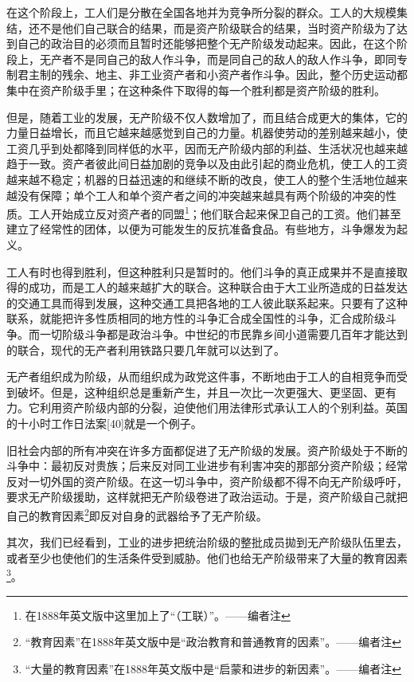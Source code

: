 \documentclass[UTF8,zihao=-4,a4paper]{ctexart}
\begin{document}
在这个阶段上，工人们是分散在全国各地并为竞争所分裂的群众。工人的大规模集结，还不是他们自己联合的结果，而是资产阶级联合的结果，当时资产阶级为了达到自己的政治目的必须而且暂时还能够把整个无产阶级发动起来。因此，在这个阶段上，无产者不是同自己的敌人作斗争，而是同自己的敌人的敌人作斗争，即同专制君主制的残余、地主、非工业资产者和小资产者作斗争。因此，整个历史运动都集中在资产阶级手里；在这种条件下取得的每一个胜利都是资产阶级的胜利。\par
但是，随着工业的发展，无产阶级不仅人数增加了，而且结合成更大的集体，它的力量日益增长，而且它越来越感觉到自己的力量。机器使劳动的差别越来越小，使工资几乎到处都降到同样低的水平，因而无产阶级内部的利益、生活状况也越来越趋于一致。资产者彼此间日益加剧的竞争以及由此引起的商业危机，使工人的工资越来越不稳定；机器的日益迅速的和继续不断的改良，使工人的整个生活地位越来越没有保障；单个工人和单个资产者之间的冲突越来越具有两个阶级的冲突的性质。工人开始成立反对资产者的同盟\footnote{在1888年英文版中这里加上了“（工联）”。——编者注}；他们联合起来保卫自己的工资。他们甚至建立了经常性的团体，以便为可能发生的反抗准备食品。有些地方，斗争爆发为起义。\par
工人有时也得到胜利，但这种胜利只是暂时的。他们斗争的真正成果并不是直接取得的成功，而是工人的越来越扩大的联合。这种联合由于大工业所造成的日益发达的交通工具而得到发展，这种交通工具把各地的工人彼此联系起来。只要有了这种联系，就能把许多性质相同的地方性的斗争汇合成全国性的斗争，汇合成阶级斗争。而一切阶级斗争都是政治斗争。中世纪的市民靠乡间小道需要几百年才能达到的联合，现代的无产者利用铁路只要几年就可以达到了。\par
无产者组织成为阶级，从而组织成为政党这件事，不断地由于工人的自相竞争而受到破坏。但是，这种组织总是重新产生，并且一次比一次更强大、更坚固、更有力。它利用资产阶级内部的分裂，迫使他们用法律形式承认工人的个别利益。英国的十小时工作日法案[40]就是一个例子。\par
旧社会内部的所有冲突在许多方面都促进了无产阶级的发展。资产阶级处于不断的斗争中：最初反对贵族；后来反对同工业进步有利害冲突的那部分资产阶级；经常反对一切外国的资产阶级。在这一切斗争中，资产阶级都不得不向无产阶级呼吁，要求无产阶级援助，这样就把无产阶级卷进了政治运动。于是，资产阶级自己就把自己的教育因素\footnote{“教育因素”在1888年英文版中是“政治教育和普通教育的因素”。——编者注}即反对自身的武器给予了无产阶级。\par
其次，我们已经看到，工业的进步把统治阶级的整批成员拋到无产阶级队伍里去，或者至少也使他们的生活条件受到威胁。他们也给无产阶级带来了大量的教育因素\footnote{“大量的教育因素”在1888年英文版中是“启蒙和进步的新因素”。——编者注}。\par
\end{document}
